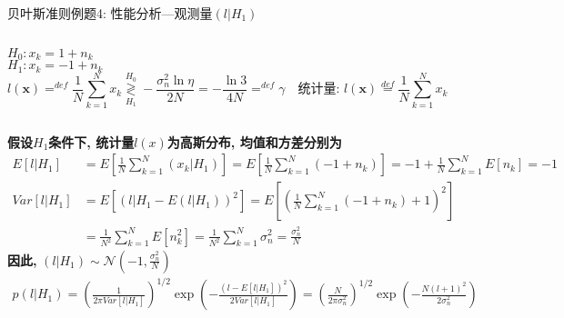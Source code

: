 \begin{frame}[shrink]{贝叶斯准则例题4: 性能分析---观测量$(l|H_1)$}
\begin{columns}
	$H_0:x_k=1+n_k$\\
	$H_1:x_k=-1+n_k$
	\[
	l(\bm{x})\mathop{=}^{def}\frac{1}{N}\sum\limits_{k=1}^{N}x_k\mathop{\gtrless}\limits_{H_1}^{H_0}-\frac{\sigma_n^2\ln\eta}{2N}=-\frac{\ln3}{4N}\mathop{=}^{def}\gamma \quad \textbf{统计量: }l(\bm{x})\mathop{=}\limits^{def}\frac{1}{N}\sum\limits_{k=1}^{N}x_k
	\]
\end{columns}
\textbf{假设$H_1$条件下, 统计量$l(x)$为高斯分布, 均值和方差分别为}
\begin{align*}
E[l|H_1]&=E\left[\frac{1}{N}\sum\limits_{k=1}^{N}(x_k|H_1)\right]=E\left[\frac{1}{N}\sum\limits_{k=1}^{N}(-1+n_k)\right]=-1+\frac{1}{N}\sum\limits_{k=1}^{N}E[n_k]=-1\\
Var[l|H_1]&=E\left[(l|H_1-E(l|H_1))^2\right]=E\left[\left(\frac{1}{N}\sum\limits_{k=1}^{N}(-1+n_k)+1\right)^2\right]\\
&=\frac{1}{N^2}\sum\limits_{k=1}^{N}E[n_k^2]=\frac{1}{N^2}\sum\limits_{k=1}^{N}\sigma_n^2=\frac{\sigma_n^2}{N}
\end{align*}
\textbf{因此, }$(l|H_1)\sim\mathcal{N}(-1,\frac{\sigma_n^2}{N})$
\begin{align*}
p(l|H_1)=\left(\frac{1}{2\pi Var[l|H_1]}\right)^{1/2}\exp\left(-\frac{(l-E[l|H_1])^2}{2 Var[l|H_1]}\right)=\left(\frac{N}{2\pi\sigma_n^2}\right)^{1/2}\exp\left(-\frac{N(l+1)^2}{2\sigma_n^2}\right)
\end{align*}
\end{frame}

